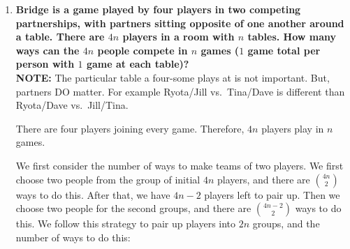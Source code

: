 \documentclass[10pt]{article}
\begin{document}
\begin{enumerate}
We consider the case when Dave picks exactly two pieces for three candy types. Dave can only pick the remaining 4 pieces of candies from one type, or there is only $1$ combination of candies he could pick up. Therefore, we have $| A_1 \cap A_2 \cap A_3 | =| A_1 \cap A_2 \cap A_4 |= | A_1 \cap A_3 \cap A_4| = | A_2 \cap A_3 \cap A_4 |= 1$.

Thus, we have the number of ways Dave can steal 10 pieces of candy from the dish without taking exactly two of any particular kind: 

\begin{align*}  
\binom{13}{3} - |A_1 \cup A_2 \cup A_3 \cup A_4| &= \binom{13}{3} - \Big[ (|A_1| + |A_2| + |A_3| + |A_4|) \\
&\quad - (| A_1 \cap A_2 | + | A_1 \cap A_3 | + | A_1 \cap A_4 | + | A_2 \cap A_3 | +| A_2 \cap A_4 | + | A_3 \cap A_4 |) \\
&\quad + (| A_1 \cap A_2 \cap A_3| + | A_1 \cap A_2 \cap A_4 | + | A_1 \cap A_3 \cap A_4| + |A_2 \cap A_3 \cap A_4|) \\
&\quad - | A_1 \cap A_2 \cap A_3 \cap A_4 |  \Big] \\ 
&= \binom{13}{3} - \left( 4 \times \binom{10}{2} -  6 \times 7 + 1 \times 4 - 0 \right)  \\ 
&= 286 - (180 - 42 + 4 - 0) \\
&= 286 - 142 \\
&= 144 
\end{align*}
\vskip 1in  %

\item
\textbf{Bridge is a game played by four players in two competing partnerships, with partners sitting opposite of one another around a table.  There are $4n$ players in a room with $n$ tables. How many ways can the $4n$ people compete in $n$ games ($1$ game total per person with $1$ game at each table)?}\\
{\footnotesize {\bf NOTE:} The particular table a four-some plays at is not important.  But, partners DO matter.  For example Ryota/Jill vs.~Tina/Dave is different than Ryota/Dave vs.~Jill/Tina.}

There are four players joining every game. Therefore, $4n$ players play in $n$ games.

We first consider the number of ways to make teams of two players. We first choose two people from the group of initial $4n$ players, and there are $\binom{4n}{2}$ ways to do this. After that, we have $4n - 2$ players left to pair up. Then we choose two people for the second groups, and there are $\binom{4n -2}{2}$ ways to do this. We follow this strategy to pair up players into $2n$ groups, and the number of ways to do this:


\end{enumerate}
\end{document}
